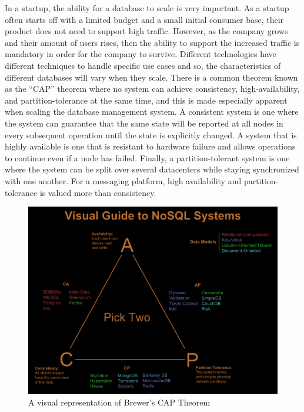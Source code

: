 \documentclass[12pt]{article}
\begin{document}
In a startup, the ability for a database to scale is very important. As a startup often starts off with a limited budget and a small initial consumer base, their product does not need to support high traffic. However, as the company grows and their amount of users rises, then the ability to support the increased traffic is mandatory in order for the company to survive. Different technologies have different techniques to handle specific use cases and so, the characteristics of different databases will vary when they scale. There is a common theorem known as the ``CAP'' theorem where no system can achieve consistency, high-availability, and partition-tolerance at the same time, and this is made especially apparent when scaling the database management system. A consistent system is one where the system can guarantee that the same state will be reported at all nodes in every subsequent operation until the state is explicitly changed. A system that is highly available is one that is resistant to hardware failure and allows operations to continue even if a node has failed. Finally, a partition-tolerant system is one where the system can be split over several datacenters while staying synchronized with one another. \cite{cap_theorem} For a messaging platform, high availability and partition-tolerance is valued more than consistency.

\begin{figure}
\begin{center}
        \includegraphics[scale=0.4]{resources/choose_two.png}
\end{center}
\caption{\label{figcaption} A visual representation of Brewer's CAP Theorem \cite{cap_picture}}
\end{figure}
\end{document}
